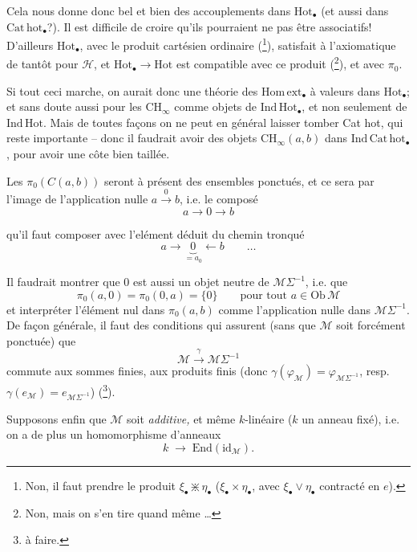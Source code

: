 \documentclass[11pt]{article}
\newcommand{\printedpage}[1]{\marginpar{\footnotesize p.~#1}}
\newcommand{\msp}[1]{\marginpar{\footnotesize [#1]}}
\newcommand{\M}{\mathcal{M}}
\newcommand{\Hot}{\mathrm{Hot}}
\newcommand{\Homext}{\mathrm{Hom\,ext}}
\begin{document}
\noindent{}Cela nous donne donc bel et bien des accouplements dans $\Hot_{\bullet}$ (et aussi dans $\mathrm{Cat\,hot}_{\bullet}$?). Il est difficile de croire qu'ils pourraient ne pas être associatifs! D'ailleurs $\Hot_{\bullet}$, avec le produit cartésien ordinaire (\footnote[4]{Non, il faut prendre le produit $\xi_{\bullet} \divideontimes \eta_{\bullet}$ ($\xi_{\bullet}\times\eta_{\bullet}$, avec $\xi_{\bullet}\vee\eta_{\bullet}$ contracté en $e$).}), satisfait à l'axiomatique de tantôt pour $\mathcal{H}$, et $\Hot_{\bullet} \longrightarrow \Hot$ est compatible avec ce produit (\footnote[5]{Non, mais on s'en tire quand même \ldots}), et avec $\pi_0$. %

Si tout ceci marche, on aurait donc une théorie des $\Homext_{\bullet}$ à valeurs dans $\Hot_{\bullet}$; et sans doute aussi pour les $\mathrm{CH}_{\infty}$ comme objets de $\mathrm{Ind\,Hot}_{\bullet}$, et non seulement de $\mathrm{Ind\,Hot}$. Mais
\printedpage{11}
de toutes façons on ne peut en général laisser tomber Cat hot, qui reste importante -- donc il faudrait avoir des objets $\mathrm{CH}_{\infty}(a,b)$ dans $\mathrm{Ind\,Cat\,hot}_{\bullet}$, pour avoir une côte bien taillée.

Les $\pi_0(C(a,b))$ seront à présent des ensembles ponctués, et ce sera par l'image de l'application nulle $a \xrightarrow{\ 0\ } b$, i.e. le composé
\[
a \longrightarrow 0 \longrightarrow b
\]

\msp{page 18}

qu'il faut composer avec l'elément déduit du chemin tronqué %
\[
a \longrightarrow \underbrace{0}_{=a_0} \longleftarrow b \qquad \ldots
\]

Il faudrait montrer que 0 est aussi un objet neutre de $\M\Sigma^{-1}$, i.e. que
\[
\pi_0(a,0) = \pi_0(0,a) = \{0\} \qquad \text{pour tout } a \in \mathrm{Ob}\,\M
\]
et interpréter l'élément nul dans $\pi_0(a,b)$ comme l'application nulle dans $\M\Sigma^{-1}$. De façon générale, il faut des conditions qui assurent (sans que $\M$ soit forcément ponctuée) que
\[
\M \xrightarrow{\ \gamma\ } \M\Sigma^{-1}
\]
commute aux sommes finies, aux produits finis (donc $\gamma(\varphi_{\M}) = \varphi_{\M\Sigma^{-1}}$, resp. $\gamma(e_{\M}) = e_{\M\Sigma^{-1}}$) (\footnote[6]{à faire.}).

Supposons enfin que $\M$ soit \textit{additive,} et même $k$-linéaire ($k$ un anneau fixé), i.e. on a de plus un homomorphisme d'anneaux
\[
k \;\longrightarrow\; \mathrm{End}(\mathrm{id}_{\M}).
\]
\end{document}
